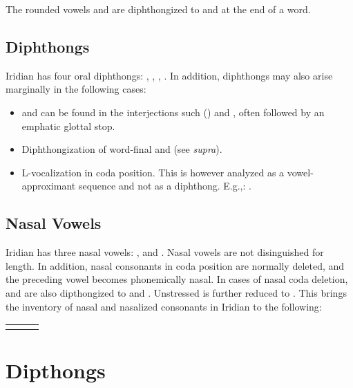 The rounded vowels  and \bt{\oe~\o:} are diphthongized to  and  at the end of a word.
\subsection{Diphthongs}
Iridian has four oral diphthongs:  ,  ,  \nt{\dte},  \nt{\dto}. In addition, diphthongs may also arise marginally in the following cases:
\begin{itemize}
	\item {} and  can be found in the interjections such   () and   , often followed by an emphatic glottal stop.
	\item Diphthongization of word-final  and \nt{\oe~\o:} (see \textit{supra}).
	\item L-vocalization in coda position. This is however analyzed as a vowel-approximant sequence and not as a diphthong. E.g.,:   .
\end{itemize}

\subsection{Nasal Vowels}
Iridian has three nasal vowels:  ,   and  . Nasal vowels are not disinguished for length. In addition, nasal consonants in coda position are normally deleted, and the preceding vowel becomes phonemically nasal. In cases of nasal coda deletion,   and   are also dipthongized to  and . Unstressed  is further reduced to . This brings the inventory of nasal and nasalized consonants in Iridian to the following: 

\begin{table}[h!]
	\centering \small
	\begin{tabularx}{0.8\textwidth}{>{\bfseries}YYY}
				&  & \\
	\end{tabularx}
\end{table}

\section{Dipthongs}


